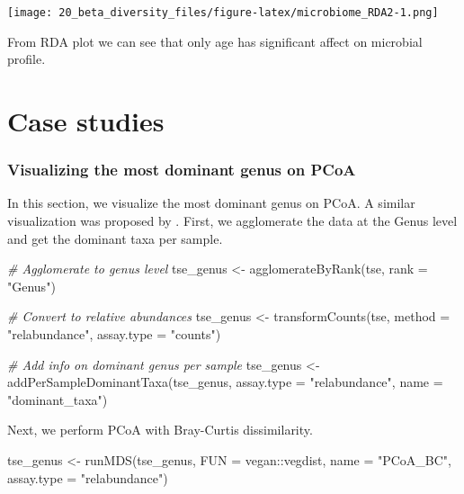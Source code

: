 \documentclass[
]{book}
\newenvironment{Shaded}{\begin{snugshade}}{\end{snugshade}}
\newcommand{\AttributeTok}[1]{\textcolor[rgb]{0.77,0.63,0.00}{#1}}
\newcommand{\CommentTok}[1]{\textcolor[rgb]{0.56,0.35,0.01}{\textit{#1}}}
\newcommand{\FunctionTok}[1]{\textcolor[rgb]{0.00,0.00,0.00}{#1}}
\newcommand{\NormalTok}[1]{#1}
\newcommand{\OtherTok}[1]{\textcolor[rgb]{0.56,0.35,0.01}{#1}}
\newcommand{\SpecialCharTok}[1]{\textcolor[rgb]{0.00,0.00,0.00}{#1}}
\newcommand{\StringTok}[1]{\textcolor[rgb]{0.31,0.60,0.02}{#1}}
\begin{document}
\texttt{[image: 20\_beta\_diversity\_files/figure-latex/microbiome\_RDA2-1.png]}

From RDA plot we can see that only age has significant affect on microbial profile.

\hypertarget{case-studies}{%
\section{Case studies}\label{case-studies}}

\hypertarget{pcoa-genus}{%
\subsubsection{Visualizing the most dominant genus on PCoA}\label{pcoa-genus}}

In this section, we visualize the most dominant genus on PCoA. A similar
visualization was proposed by \citeyearpar{Salosensaari2021}. First, we agglomerate the
data at the Genus level and get the dominant taxa per sample.

\begin{Shaded}
\begin{Highlighting}[]
\CommentTok{\# Agglomerate to genus level}
\NormalTok{tse\_genus }\OtherTok{\textless{}{-}} \FunctionTok{agglomerateByRank}\NormalTok{(tse,}
                               \AttributeTok{rank =} \StringTok{"Genus"}\NormalTok{)}

\CommentTok{\# Convert to relative abundances}
\NormalTok{tse\_genus }\OtherTok{\textless{}{-}} \FunctionTok{transformCounts}\NormalTok{(tse,}
                             \AttributeTok{method =} \StringTok{"relabundance"}\NormalTok{,}
                             \AttributeTok{assay.type =} \StringTok{"counts"}\NormalTok{)}

\CommentTok{\# Add info on dominant genus per sample}
\NormalTok{tse\_genus }\OtherTok{\textless{}{-}} \FunctionTok{addPerSampleDominantTaxa}\NormalTok{(tse\_genus,}
                                      \AttributeTok{assay.type =} \StringTok{"relabundance"}\NormalTok{,}
                                      \AttributeTok{name =} \StringTok{"dominant\_taxa"}\NormalTok{)}
\end{Highlighting}
\end{Shaded}

Next, we perform PCoA with Bray-Curtis dissimilarity.

\begin{Shaded}
\begin{Highlighting}[]
\NormalTok{tse\_genus }\OtherTok{\textless{}{-}} \FunctionTok{runMDS}\NormalTok{(tse\_genus,}
                    \AttributeTok{FUN =}\NormalTok{ vegan}\SpecialCharTok{::}\NormalTok{vegdist,}
                    \AttributeTok{name =} \StringTok{"PCoA\_BC"}\NormalTok{,}
                    \AttributeTok{assay.type =} \StringTok{"relabundance"}\NormalTok{)}
\end{Highlighting}
\end{Shaded}
\end{document}
